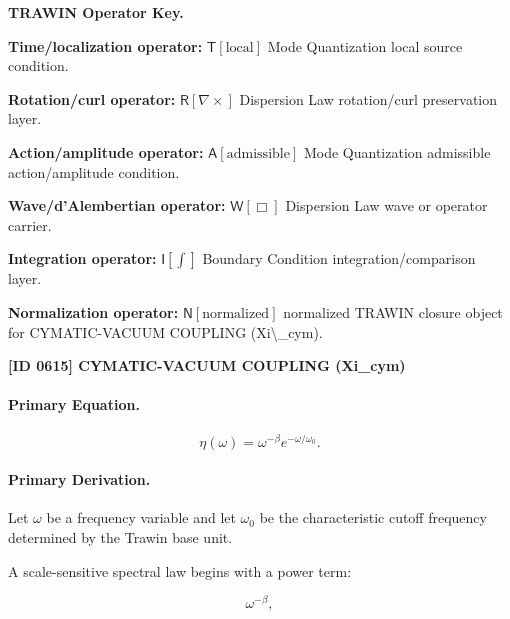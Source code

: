 \par\vspace{0.45\baselineskip}
\noindent\begin{minipage}[t]{\linewidth}
\begingroup
\small
\raggedright
\textbf{TRAWIN Operator Key.}\par
\noindent\textbf{Time/localization operator:} $\mathsf{T}\!\left[\mathrm{local}\right]$ Mode Quantization local source condition.\par
\noindent\textbf{Rotation/curl operator:} $\mathsf{R}\!\left[\nabla\times\right]$ Dispersion Law rotation/curl preservation layer.\par
\noindent\textbf{Action/amplitude operator:} $\mathsf{A}\!\left[\mathrm{admissible}\right]$ Mode Quantization admissible action/amplitude condition.\par
\noindent\textbf{Wave/d'Alembertian operator:} $\mathsf{W}\!\left[\Box\right]$ Dispersion Law wave or operator carrier.\par
\noindent\textbf{Integration operator:} $\mathsf{I}\!\left[\int\right]$ Boundary Condition integration/comparison layer.\par
\noindent\textbf{Normalization operator:} $\mathsf{N}\!\left[\mathrm{normalized}\right]$ normalized TRAWIN closure object for CYMATIC-VACUUM COUPLING (Xi\textbackslash{}\_cym).\par
\endgroup
\end{minipage}

\clearpage
\noindent\textbf{[ID 0615] CYMATIC-VACUUM COUPLING (Xi\_cym)}\par
\vspace{0.35em}
\paragraph{Primary Equation.}
\begin{equation}
\eta(\omega)
=
\omega^{-\beta}
e^{-\omega/\omega_0}.
\end{equation}

\paragraph{Primary Derivation.}
Let $\omega$ be a frequency variable and let $\omega_0$ be the characteristic cutoff frequency determined by the Trawin base unit.

A scale-sensitive spectral law begins with a power term:

\begin{equation}
\omega^{-\beta},
\end{equation}

